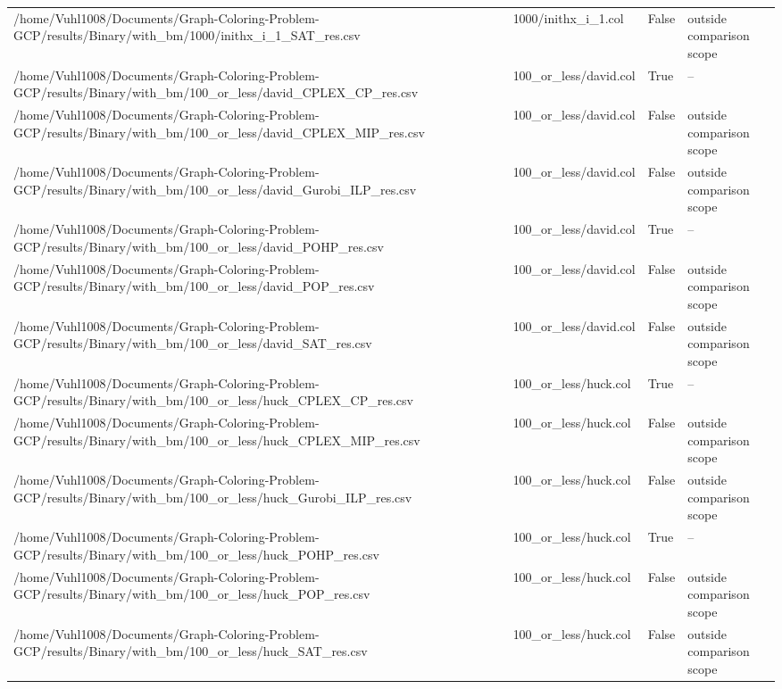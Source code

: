 \begin{table}[htbp]
\begin{tabular}{llll}
/home/Vuhl1008/Documents/Graph-Coloring-Problem-GCP/results/Binary/with\_bm/1000/inithx\_i\_1\_SAT\_res.csv & 1000/inithx\_i\_1.col & False & outside comparison scope \\
/home/Vuhl1008/Documents/Graph-Coloring-Problem-GCP/results/Binary/with\_bm/100\_or\_less/david\_CPLEX\_CP\_res.csv & 100\_or\_less/david.col & True & -- \\
/home/Vuhl1008/Documents/Graph-Coloring-Problem-GCP/results/Binary/with\_bm/100\_or\_less/david\_CPLEX\_MIP\_res.csv & 100\_or\_less/david.col & False & outside comparison scope \\
/home/Vuhl1008/Documents/Graph-Coloring-Problem-GCP/results/Binary/with\_bm/100\_or\_less/david\_Gurobi\_ILP\_res.csv & 100\_or\_less/david.col & False & outside comparison scope \\
/home/Vuhl1008/Documents/Graph-Coloring-Problem-GCP/results/Binary/with\_bm/100\_or\_less/david\_POHP\_res.csv & 100\_or\_less/david.col & True & -- \\
/home/Vuhl1008/Documents/Graph-Coloring-Problem-GCP/results/Binary/with\_bm/100\_or\_less/david\_POP\_res.csv & 100\_or\_less/david.col & False & outside comparison scope \\
/home/Vuhl1008/Documents/Graph-Coloring-Problem-GCP/results/Binary/with\_bm/100\_or\_less/david\_SAT\_res.csv & 100\_or\_less/david.col & False & outside comparison scope \\
/home/Vuhl1008/Documents/Graph-Coloring-Problem-GCP/results/Binary/with\_bm/100\_or\_less/huck\_CPLEX\_CP\_res.csv & 100\_or\_less/huck.col & True & -- \\
/home/Vuhl1008/Documents/Graph-Coloring-Problem-GCP/results/Binary/with\_bm/100\_or\_less/huck\_CPLEX\_MIP\_res.csv & 100\_or\_less/huck.col & False & outside comparison scope \\
/home/Vuhl1008/Documents/Graph-Coloring-Problem-GCP/results/Binary/with\_bm/100\_or\_less/huck\_Gurobi\_ILP\_res.csv & 100\_or\_less/huck.col & False & outside comparison scope \\
/home/Vuhl1008/Documents/Graph-Coloring-Problem-GCP/results/Binary/with\_bm/100\_or\_less/huck\_POHP\_res.csv & 100\_or\_less/huck.col & True & -- \\
/home/Vuhl1008/Documents/Graph-Coloring-Problem-GCP/results/Binary/with\_bm/100\_or\_less/huck\_POP\_res.csv & 100\_or\_less/huck.col & False & outside comparison scope \\
/home/Vuhl1008/Documents/Graph-Coloring-Problem-GCP/results/Binary/with\_bm/100\_or\_less/huck\_SAT\_res.csv & 100\_or\_less/huck.col & False & outside comparison scope \\

\end{tabular}
\end{table}
